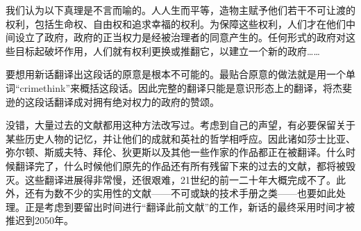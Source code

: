 我们认为以下真理是不言而喻的。人人生而平等，造物主赋予他们若干不可让渡的权利，包括生命权、自由权和追求幸福的权利。为保障这些权利，人们才在他们中间设立了政府，政府的正当权力是经被治理者的同意产生的。任何形式的政府对这些目标起破坏作用，人们就有权利更换或推翻它，以建立一个新的政府\ldots\ldots{}

要想用新话翻译出这段话的原意是根本不可能的。最贴合原意的做法就是用一个单词``crimethink''来概括这段话。因此完整的翻译只能是意识形态上的翻译，将杰斐逊的这段话翻译成对拥有绝对权力的政府的赞颂。

没错，大量过去的文献都用这种方法改写过。考虑到自己的声望，有必要保留关于某些历史人物的记忆，并让他们的成就和英社的哲学相呼应。因此诸如莎士比亚、弥尔顿、斯威夫特、拜伦、狄更斯以及其他一些作家的作品都正在被翻译。什么时候翻译完了，什么时候他们原先的作品还有所有残留下来的过去的文献，都将被毁灭。这些翻译进展得非常慢，还很艰难，21世纪的前一二十年大概完成不了。此外，还有为数不少的实用性的文献——不可或缺的技术手册之类——也要如此处理。正是考虑到要留出时间进行``翻译此前文献''的工作，新话的最终采用时间才被推迟到2050年。
